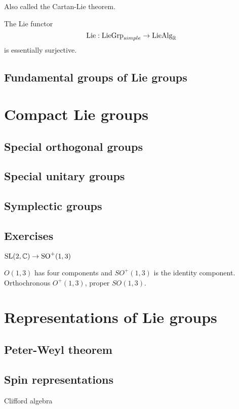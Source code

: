 \documentclass{../../large}
\begin{document}
\begin{prb}
Also called the Cartan-Lie theorem.
\begin{parts}
\item The Lie functor
\[\mathrm{Lie}:\mathrm{LieGrp}_{simple}\to\mathrm{LieAlg}_{\mathbb{R}}\]
is essentially surjective.
\end{parts}
\end{prb}

\section{Fundamental groups of Lie groups}



\chapter{Compact Lie groups}
\section{Special orthogonal groups}
\section{Special unitary groups}
\section{Symplectic groups}

\section*{Exercises}
\begin{prb}
$\mathrm{SL}(2,\mathbb{C})\to\mathrm{SO}^+(1,3)$
\begin{parts}
\item $O(1,3)$ has four components and $SO^+(1,3)$ is the identity component. Orthochronous $O^+(1,3)$, proper $SO(1,3)$.
\end{parts}
\end{prb}


\chapter{Representations of Lie groups}
\section{Peter-Weyl theorem}
\section{Spin representations}
Clifford algebra
\end{document}

